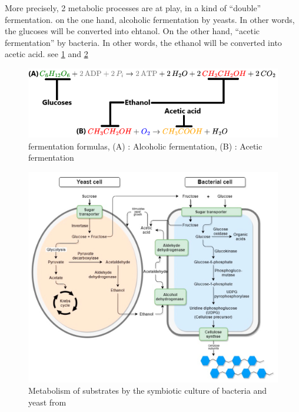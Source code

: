 More precisely, 2 metabolic processes are at play, in a kind of “double” fermentation. 
on the one hand, alcoholic fermentation by yeasts. In other words, the glucoses will be converted into ehtanol. 
On the other hand, “acetic fermentation” by bacteria. In other words, the ethanol will be converted into acetic acid. see \ref{fig:fermentation formula} and \ref{fig:metabolic}


\begin{figure}[h]
    \centering
    \includegraphics{images/formule-chimique.png}
    \caption{fermentation formulas, (A) : Alcoholic fermentation, (B) : Acetic fermentation}
    \label{fig:fermentation formula}
\end{figure}

\begin{figure}[h]
    \centering
    \includegraphics{images/schema_metabolique.png}
    \caption{Metabolism of substrates by the symbiotic culture of bacteria and yeast from\cite{laavanya2021current}}
    \label{fig:metabolic}
\end{figure}

